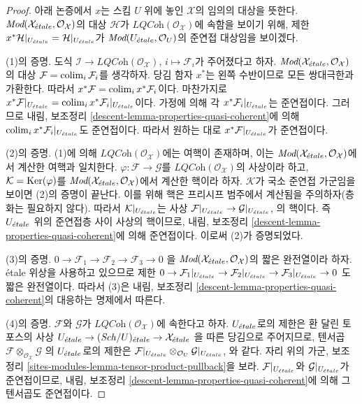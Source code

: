 \begin{proof}
아래 논증에서 $x$는 스킴 $U$ 위에 놓인 $\mathcal{X}$의 임의의
대상을 뜻한다. $\textit{Mod}(\mathcal{X}_{\acute{e}tale},
\mathcal{O}_\mathcal{X})$의 대상 $\mathcal{H}$가
$\textit{LQCoh}(\mathcal{O}_\mathcal{X})$에 속함을 보이기 위해,
제한 $x^*\mathcal{H}|_{U_{\acute{e}tale}} = \mathcal{H}|_{U_{\acute{e}tale}}$가
$\textit{Mod}(U_{\acute{e}tale}, \mathcal{O}_U)$의 준연접 대상임을 보이겠다.

\medskip\noindent
(1)의 증명. 도식
$\mathcal{I} \to \textit{LQCoh}(\mathcal{O}_\mathcal{X})$,
$i \mapsto \mathcal{F}_i$가 주어졌다고 하자.
$\textit{Mod}(\mathcal{X}_{\acute{e}tale}, \mathcal{O}_\mathcal{X})$의 대상
$\mathcal{F} = \mathop{\mathrm{colim}}\nolimits_i \mathcal{F}_i$를 생각하자.
당김 함자 $x^*$는 왼쪽 수반이므로 모든 쌍대극한과 가환한다.
따라서 $x^*\mathcal{F} = \mathop{\mathrm{colim}}\nolimits_i x^*\mathcal{F}_i$이다.
마찬가지로
$x^*\mathcal{F}|_{U_{\acute{e}tale}} =
\mathop{\mathrm{colim}}\nolimits_i x^*\mathcal{F}_i|_{U_{\acute{e}tale}}$이다.
가정에 의해 각 $x^*\mathcal{F}_i|_{U_{\acute{e}tale}}$는 준연접이다.
그러므로 내림, 보조정리
\ref{descent-lemma-properties-quasi-coherent}에 의해
$\mathop{\mathrm{colim}}\nolimits_i x^*\mathcal{F}_i|_{U_{\acute{e}tale}}$도 준연접이다.
따라서 원하는 대로 $x^*\mathcal{F}|_{U_{\acute{e}tale}}$가 준연접이다.

\medskip\noindent
(2)의 증명. (1)에 의해
$\textit{LQCoh}(\mathcal{O}_\mathcal{X})$에는 여핵이 존재하며,
이는 $\textit{Mod}(\mathcal{X}_{\acute{e}tale},
\mathcal{O}_\mathcal{X})$에서 계산한 여핵과 일치한다.
$\varphi : \mathcal{F} \to \mathcal{G}$를
$\textit{LQCoh}(\mathcal{O}_\mathcal{X})$의 사상이라 하고,
$\mathcal{K} = \mathop{\mathrm{Ker}}(\varphi)$를
$\textit{Mod}(\mathcal{X}_{\acute{e}tale}, \mathcal{O}_\mathcal{X})$에서
계산한 핵이라 하자. $\mathcal{K}$가 국소 준연접 가군임을 보이면
(2)의 증명이 끝난다. 이를 위해 핵은 프리시프 범주에서
계산됨을 주의하자(층화는 필요하지 않다).
따라서 $\mathcal{K}|_{U_{\acute{e}tale}}$는 사상
$\mathcal{F}|_{U_{\acute{e}tale}} \to \mathcal{G}|_{U_{\acute{e}tale}}$,
의 핵이다. 즉 $U_{\acute{e}tale}$ 위의 준연접층 사이 사상의 핵이므로,
내림, 보조정리 \ref{descent-lemma-properties-quasi-coherent}에 의해
준연접이다. 이로써 (2)가 증명되었다.

\medskip\noindent
(3)의 증명.
$0 \to \mathcal{F}_1 \to \mathcal{F}_2 \to \mathcal{F}_3 \to 0$
을 $\textit{Mod}(\mathcal{X}_{\acute{e}tale}, \mathcal{O}_\mathcal{X})$의
짧은 완전열이라 하자.
\'etale 위상을 사용하고 있으므로 제한
$0 \to \mathcal{F}_1|_{U_{\acute{e}tale}} \to
\mathcal{F}_2|_{U_{\acute{e}tale}} \to \mathcal{F}_3|_{U_{\acute{e}tale}} \to 0$
도 짧은 완전열이다. 따라서 (3)은 내림, 보조정리
\ref{descent-lemma-properties-quasi-coherent}의 대응하는 명제에서 따른다.

\medskip\noindent
(4)의 증명. $\mathcal{F}$와 $\mathcal{G}$가
$\textit{LQCoh}(\mathcal{O}_\mathcal{X})$에 속한다고 하자.
$U_{\acute{e}tale}$로의 제한은 환 달린 토포스의 사상
$U_{\acute{e}tale} \to (\mathit{Sch}/U)_{\acute{e}tale} \to \mathcal{X}_{\acute{e}tale}$
을 따른 당김으로 주어지므로, 텐서곱
$\mathcal{F} \otimes_{\mathcal{O}_\mathcal{X}} \mathcal{G}$
의 $U_{\acute{e}tale}$로의 제한은
$\mathcal{F}|_{U_{\acute{e}tale}} \otimes_{\mathcal{O}_U} \mathcal{G}|_{U_{\acute{e}tale}}$,
와 같다. 자리 위의 가군, 보조정리
\ref{sites-modules-lemma-tensor-product-pullback}을 보라.
$\mathcal{F}|_{U_{\acute{e}tale}}$와 $\mathcal{G}|_{U_{\acute{e}tale}}$가
준연접이므로, 내림, 보조정리
\ref{descent-lemma-properties-quasi-coherent}에 의해
그 텐서곱도 준연접이다.


\end{proof}
